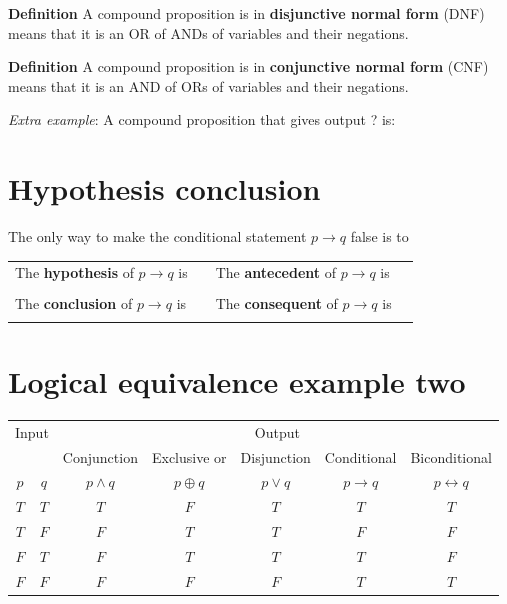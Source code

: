 \documentclass[12pt, oneside]{article}
\begin{document}
{\bf  Definition} A compound proposition is in {\bf disjunctive normal form}  (DNF) means
that  it is an OR of ANDs of variables and their negations.

{\bf  Definition} A compound proposition is in {\bf conjunctive normal form}  (CNF) means
that  it is an AND of ORs of variables and their negations.


{\it Extra example}: A compound proposition that  gives output ? is: 


\vfill
\vfill \vfill
\section*{Hypothesis conclusion}


The only way to make  the conditional statement $p \to q$ false is to \underline{\phantom{\hspace{3in}}}

\begin{tabular}{llll}
The {\bf  hypothesis}  of $p \to q$ is  &\underline{\phantom{\hspace{1in}}} &
The {\bf  antecedent}  of $p \to q$ is  &\underline{\phantom{\hspace{1in}}} \\
&&&  \\
The {\bf  conclusion}  of $p \to q$ is & \underline{\phantom{\hspace{1in}}}&
The {\bf  consequent}  of $p \to q$ is & \underline{\phantom{\hspace{1in}}}\\
&&&  \\
\end{tabular}

\vfill \vfill
\section*{Logical equivalence example two}


\begin{center}
    \begin{tabular}{cc||c|c|c|c|c}
    \multicolumn{2}{c||}{Input}  & \multicolumn{5}{c}{Output} \\
     & & Conjunction &  Exclusive or & Disjunction  &  Conditional & Biconditional  \\
    $p$ & $q$ & $p \wedge q$ &  $p  \oplus  q$ & $p \vee  q$ & $p \to q$ & $p \leftrightarrow q$\\
    \hline
    $T$ & $T$ & $T$ & $F$ & $T$ & $T$& $T$\\
    $T$ & $F$ & $F$ & $T$ & $T$ & $F$& $F$\\
    $F$ & $T$ & $F$ & $T$ & $T$ & $T$& $F$\\
    $F$ & $F$ & $F$ & $F$ & $F$ & $T$& $T$\\
    \end{tabular}
    \end{center}
    
\end{document}
